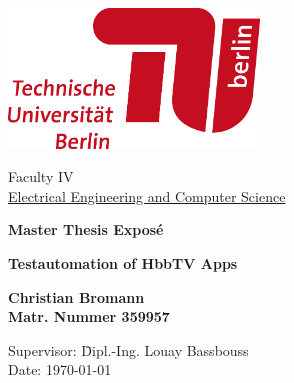 %
%

\thispagestyle{empty}

\begin{center}

\includegraphics[width=0.5\textwidth]{./images/tu-logo.jpg}

\vspace{1.5cm}

Faculty IV\\
\href{http://www.eecs.tu-berlin.de/menue/fakultaet_iv}{Electrical Engineering and Computer Science}

\vspace{3.5cm}

{\Large \textbf{Master Thesis Exposé}}\\

\vspace{1cm}

{\Huge \textbf{Testautomation of HbbTV Apps}}\\

\vspace{3cm}

{\Large \textbf{Christian Bromann}}\\
\textbf{Matr. Nummer 359957}

\vspace{1.5cm}

\parbox{1cm}{
\begin{large}
\begin{tabbing}
Supervisor: \hspace{0.5cm}\=Dipl.-Ing. Louay Bassbouss\\
Date: \> \today\\
\end{tabbing}
\end{large}}\\

\end{center}

\newpage
